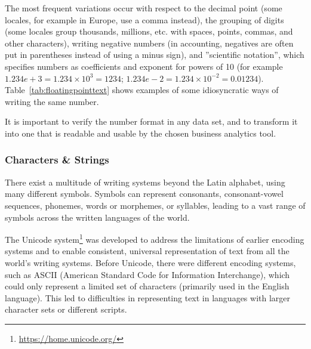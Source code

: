 The most frequent variations occur with respect to the decimal point (some locales, for example in Europe, use a comma instead), the grouping of digits (some locales group thousands, millions, etc. with spaces, points, commas, and other characters), writing negative numbers (in accounting, negatives are often put in parentheses instead of using a minus sign), and ''scientific notation'', which specifies numbers as coefficients and exponent for powers of 10 (for example $1.234e+3 = 1.234 \times 10^3 = 1234$; $1.234e-2 = 1.234 \times 10^{-2} = 0.01234$). Table~\ref{tab:floatingpointtext} shows examples of some idiosyncratic ways of writing the same number. 

\begin{infobox}
It is important to verify the number format in any data set, and to transform it into one that is readable and usable by the chosen business analytics tool. 
\end{infobox}

\subsubsection*{Characters \& Strings}

There exist a multitude of writing systems beyond the Latin alphabet, using many different symbols. Symbols can represent consonants, consonant-vowel sequences, phonemes, words or morphemes, or syllables, leading to a vast range of symbols across the written languages of the world. 

The Unicode system\footnote{\url{https://home.unicode.org/}} was developed to address the limitations of earlier encoding systems and to enable consistent, universal representation of text from all the world's writing systems. Before Unicode, there were different encoding systems, such as ASCII (American Standard Code for Information Interchange), which could only represent a limited set of characters (primarily used in the English language). This led to difficulties in representing text in languages with larger character sets or different scripts. 

